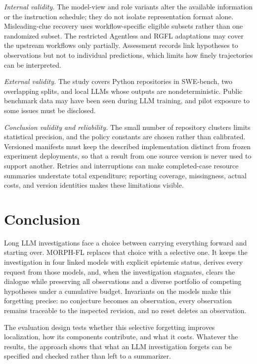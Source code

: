 \documentclass[letterpaper,journal]{IEEEtran}
\newcommand{\tool}{MORPH-FL}
\begin{document}
\emph{Internal validity.} The model-view and role variants alter the available information or the instruction schedule; they do not isolate representation format alone. Misleading-clue recovery uses workflow-specific eligible subsets rather than one randomized subset. The restricted Agentless and RGFL adaptations may cover the upstream workflows only partially. Assessment records link hypotheses to observations but not to individual predictions, which limits how finely trajectories can be interpreted.

\emph{External validity.} The study covers Python repositories in SWE-bench, two overlapping splits, and local LLMs whose outputs are nondeterministic. Public benchmark data may have been seen during LLM training, and pilot exposure to some issues must be disclosed.

\emph{Conclusion validity and reliability.} The small number of repository clusters limits statistical precision, and the policy constants are chosen rather than calibrated. Versioned manifests must keep the described implementation distinct from frozen experiment deployments, so that a result from one source version is never used to support another. Retries and interruptions can make completed-case resource summaries understate total expenditure; reporting coverage, missingness, actual costs, and version identities makes these limitations visible.

\section{Conclusion}\label{sec:conclusion}
Long LLM investigations face a choice between carrying everything forward and starting over. \tool{} replaces that choice with a selective one. It keeps the investigation in four linked models with explicit epistemic status, derives every request from those models, and, when the investigation stagnates, clears the dialogue while preserving all observations and a diverse portfolio of competing hypotheses under a cumulative budget. Invariants on the models make this forgetting precise: no conjecture becomes an observation, every observation remains traceable to the inspected revision, and no reset deletes an observation.

The evaluation design tests whether this selective forgetting improves localization, how its components contribute, and what it costs. Whatever the results, the approach shows that what an LLM investigation forgets can be specified and checked rather than left to a summarizer.
\end{document}
